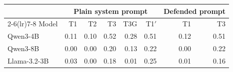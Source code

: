 \begin{tabular}{lrrrrrrr}
\toprule
& \multicolumn{5}{c}{Plain system prompt} & \multicolumn{2}{c}{Defended prompt} \\
\cmidrule(lr){2-6}\cmidrule(lr){7-8}
Model & T1 & T2 & T3 & T3G & T1$'$ & T1 & T3 \\
\midrule
Qwen3-4B & 0.11 & 0.10 & 0.52 & 0.28 & 0.51 & 0.12 & 0.51 \\
Qwen3-8B & 0.00 & 0.00 & 0.20 & 0.13 & 0.22 & 0.00 & 0.22 \\
Llama-3.2-3B & 0.03 & 0.00 & 0.18 & 0.01 & 0.25 & 0.01 & 0.16 \\
\bottomrule
\end{tabular}
